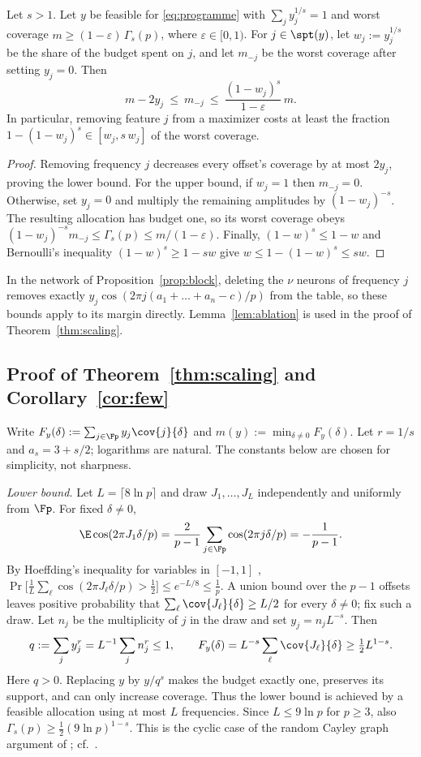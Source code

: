 \begin{lemma}\label{lem:ablation}
Let $s>1$. Let $y$ be feasible for \eqref{eq:programme} with $\sum_jy_j^{1/s}=1$ and worst coverage $m\ge(1-\varepsilon)\,\Gamma_s(p)$, where $\varepsilon\in[0,1)$. For $j\in\spt(y)$, let $w_j:=y_j^{1/s}$ be the share of the budget spent on $j$, and let $m_{-j}$ be the worst coverage after setting $y_j=0$. Then
\[
m-2y_j\ \le\ m_{-j}\ \le\ \frac{(1-w_j)^s}{1-\varepsilon}\,m .
\]
In particular, removing feature $j$ from a maximizer costs at least the fraction $1-(1-w_j)^s\in[w_j,s\,w_j]$ of the worst coverage.
\end{lemma}
\begin{proof}
Removing frequency $j$ decreases every offset's coverage by at most $2y_j$, proving the lower bound. For the upper bound, if $w_j=1$ then $m_{-j}=0$. Otherwise, set $y_j=0$ and multiply the remaining amplitudes by $(1-w_j)^{-s}$. The resulting allocation has budget one, so its worst coverage obeys $(1-w_j)^{-s}m_{-j}\le\Gamma_s(p)\le m/(1-\varepsilon)$. Finally, $(1-w)^s\le1-w$ and Bernoulli's inequality $(1-w)^s\ge1-sw$ give $w\le1-(1-w)^s\le sw$.
\end{proof}
In the network of Proposition~\ref{prop:block}, deleting the $\nu$ neurons of frequency $j$ removes exactly $y_j\cos(2\pi j(a_1+\dots+a_n-c)/p)$ from the table, so these bounds apply to its margin directly. Lemma~\ref{lem:ablation} is used in the proof of Theorem~\ref{thm:scaling}.

\subsection{Proof of Theorem~\ref{thm:scaling} and Corollary~\ref{cor:few}}\label{app:scaling}

Write $F_y(\delta):=\sum_{j\in\Fp}y_j\cov{j}{\delta}$ and $m(y):=\min_{\delta\neq0}F_y(\delta)$. Let $r=1/s$ and $a_s=3+s/2$; logarithms are natural. The constants below are chosen for simplicity, not sharpness.

\emph{Lower bound.} Let $L=\lceil8\ln p\rceil$ and draw $J_1,\dots,J_L$ independently and uniformly from $\Fp$. For fixed $\delta\neq0$,
\[
\E\cos(2\pi J_1\delta/p)=\frac2{p-1}\sum_{j\in\Fp}\cos(2\pi j\delta/p)=-\frac1{p-1}.
\]
By Hoeffding's inequality for variables in $[-1,1]$ \citep[Thm.~2]{hoeffding1963probability}, $\Pr\big[\frac1L\sum_\ell\cos(2\pi J_\ell\delta/p)>\frac12\big]\le e^{-L/8}\le\frac1p$. A union bound over the $p-1$ offsets leaves positive probability that $\sum_\ell\cov{J_\ell}{\delta}\ge L/2$ for every $\delta\neq0$; fix such a draw.
Let $n_j$ be the multiplicity of $j$ in the draw and set $y_j=n_jL^{-s}$. Then
\[
q:=\sum_jy_j^r=L^{-1}\sum_jn_j^r\le1,
\qquad
F_y(\delta)=L^{-s}\sum_\ell\cov{J_\ell}{\delta}\ge\tfrac12L^{1-s}.
\]
Here $q>0$. Replacing $y$ by $y/q^s$ makes the budget exactly one, preserves its support, and can only increase coverage. Thus the lower bound is achieved by a feasible allocation using at most $L$ frequencies. Since $L\le9\ln p$ for $p\ge3$, also $\Gamma_s(p)\ge\frac12(9\ln p)^{1-s}$. This is the cyclic case of the random Cayley graph argument of \citet[Sec.~3, Thm.~2]{alon1994random}; cf.\ \citet[Thm.~4.7]{mccracken2025}.

